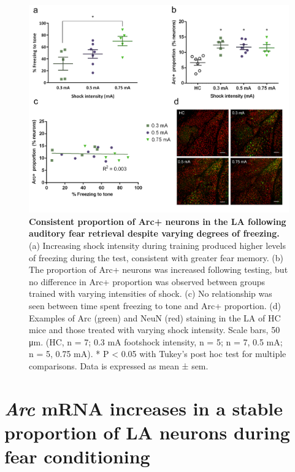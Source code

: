 \documentclass[12pt,a4paperpaper,]{report}
\begin{document}
\begin{figure}[htbp]
\centering
\includegraphics{source/figures/figure_2.jpg}
\caption{\textbf{Consistent proportion of Arc+ neurons in the LA
following auditory fear retrieval despite varying degrees of freezing.}
(a) Increasing shock intensity during training produced higher levels of
freezing during the test, consistent with greater fear memory. (b) The
proportion of Arc+ neurons was increased following testing, but no
difference in Arc+ proportion was observed between groups trained with
varying intensities of shock. (c) No relationship was seen between time
spent freezing to tone and Arc+ proportion. (d) Examples of Arc (green)
and NeuN (red) staining in the LA of HC mice and those treated with
varying shock intensity. Scale bars, 50 μm. (HC, n = 7; 0.3 mA footshock
intensity, n = 5; n = 7, 0.5 mA; n = 5, 0.75 mA). * P \textless{} 0.05
with Tukey's post hoc test for multiple comparisons. Data is expressed
as mean ± sem. \label{ref_a_figure}}
\end{figure}

\section{\texorpdfstring{\emph{Arc} mRNA increases in a stable
proportion of LA neurons during fear
conditioning}{Arc mRNA increases in a stable proportion of LA neurons during fear conditioning}}\label{arc-mrna-increases-in-a-stable-proportion-of-la-neurons-during-fear-conditioning}
\end{document}

